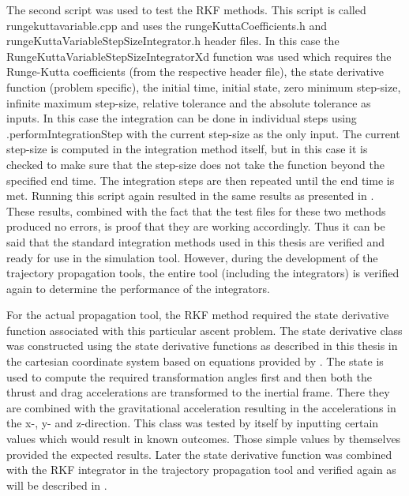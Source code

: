\noindent
The second script was used to test the \ac{RKF} methods. This script is called rungekuttavariable.cpp and uses the rungeKuttaCoefficients.h and rungeKuttaVariableStepSizeIntegrator.h header files. In this case the RungeKuttaVariableStepSizeIntegratorXd function was used which requires the Runge-Kutta coefficients (from the respective header file), the state derivative function (problem specific), the initial time, initial state, zero minimum step-size, infinite maximum step-size, relative tolerance and the absolute tolerance as inputs. In this case the integration can be done in individual steps using .performIntegrationStep with the current step-size as the only input. The current step-size is computed in the integration method itself, but in this case it is checked to make sure that the step-size does not take the function beyond the specified end time. The integration steps are then repeated until the end time is met. Running this script again resulted in the same results as presented in . \\

\noindent
These results, combined with the fact that the test files for these two methods produced no errors, is proof that they are working accordingly. Thus it can be said that the standard integration methods used in this thesis are verified and ready for use in the simulation tool. However, during the development of the trajectory propagation tools, the entire tool (including the integrators) is verified again to determine the performance of the integrators.

For the actual propagation tool, the \ac{RKF} method required the state derivative function associated with this particular ascent problem. The state derivative class was constructed using the state derivative functions as described in this thesis in the cartesian coordinate system based on equations provided by \cite{mooij1994motion}. The state is used to compute the required transformation angles first and then both the thrust and drag accelerations are transformed to the inertial frame. There they are combined with the gravitational acceleration resulting in the accelerations in the x-, y- and z-direction. This class was tested by itself by inputting certain values which would result in known outcomes. Those simple values by themselves provided the expected results. Later the state derivative function was combined with the \ac{RKF} integrator in the trajectory propagation tool and verified again as will be described in .  



